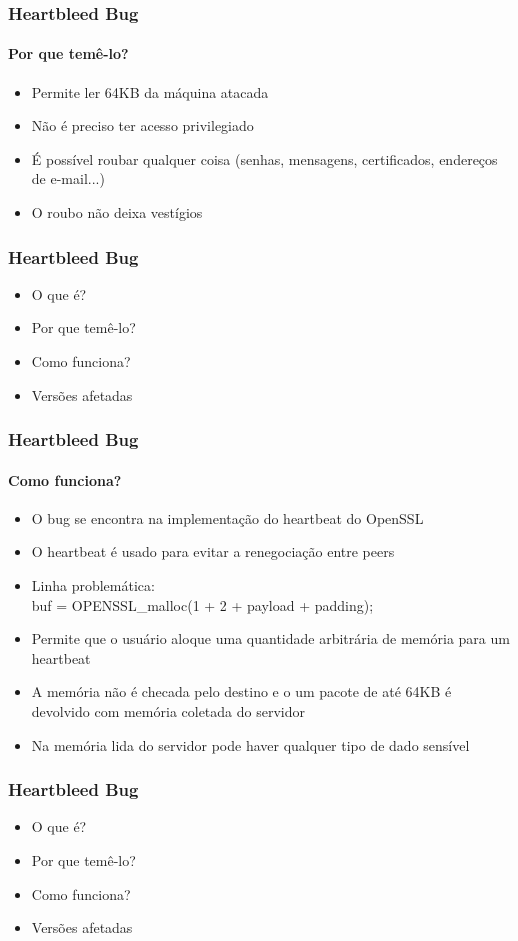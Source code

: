 \documentclass{beamer}
\begin{document}
\begin{frame}
	\frametitle{Heartbleed Bug}
	\framesubtitle{Por que temê-lo?}
	\begin{itemize}
		\item Permite ler 64KB da máquina atacada
		\item Não é preciso ter acesso privilegiado
		\item É possível roubar qualquer coisa (senhas, mensagens, certificados, endereços de e-mail...)
		\item O roubo não deixa vestígios
	\end{itemize}
\end{frame}

\begin{frame}
	\frametitle{Heartbleed Bug}
	\begin{itemize}
		\item \textcolor{covered}{O que é?}
		\item \textcolor{covered}{Por que temê-lo?}
		\item Como funciona?
		\item Versões afetadas
	\end{itemize}
\end{frame}

\begin{frame}
	\frametitle{Heartbleed Bug}
	\framesubtitle{Como funciona?}
	\begin{itemize}
		\item O bug se encontra na implementação do heartbeat do OpenSSL
		\item O heartbeat é usado para evitar a renegociação entre peers
		\item Linha problemática:\\
		buf = OPENSSL\_malloc(1 + 2 + payload + padding);
		\item Permite que o usuário aloque uma quantidade arbitrária de memória para um heartbeat
		\item A memória não é checada pelo destino e o um pacote de até 64KB é devolvido com memória coletada do servidor
		\item Na memória lida do servidor pode haver qualquer tipo de dado sensível
	\end{itemize}
\end{frame}

\begin{frame}
	\frametitle{Heartbleed Bug}
	\begin{itemize}
		\item \textcolor{covered}{O que é?}
		\item \textcolor{covered}{Por que temê-lo?}
		\item \textcolor{covered}{Como funciona?}
		\item Versões afetadas
	\end{itemize}
\end{frame}
\end{document}
